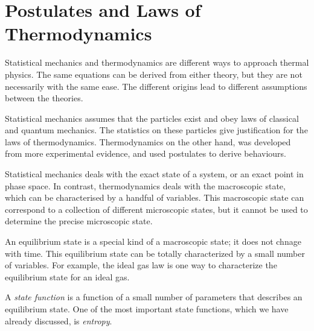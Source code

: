 \chapter{Postulates and Laws of Thermodynamics}
Statistical mechanics and thermodynamics are different ways to approach thermal physics. 
The same equations can be derived from either theory, but they are not necessarily with the same ease.
The different origins lead to different assumptions between the theories.

Statistical mechanics assumes that the particles exist and obey laws of classical and quantum mechanics. The statistics on these particles give justification for the laws of thermodynamics. Thermodynamics on the other hand, was developed from more experimental evidence, and used postulates to derive behaviours. 

Statistical mechanics deals with the exact state of a system, or an exact point in phase space. In contrast, thermodynamics deals with the macroscopic state, which can be characterised by a handful of variables. This macroscopic state can correspond to a collection of different microscopic states, but it cannot be used to determine the precise microscopic state. 

An equilibrium state is a special kind of a macroscopic state; it does not chnage with time. This equilibrium state can be totally characterized by a small number of variables. For example, the ideal gas law is one way to characterize the equilibrium state for an ideal gas.

A \emph{state function} is a function of a small number of parameters that describes an equilibrium state. One of the most important state functions, which we have already discussed, is \emph{entropy}.

